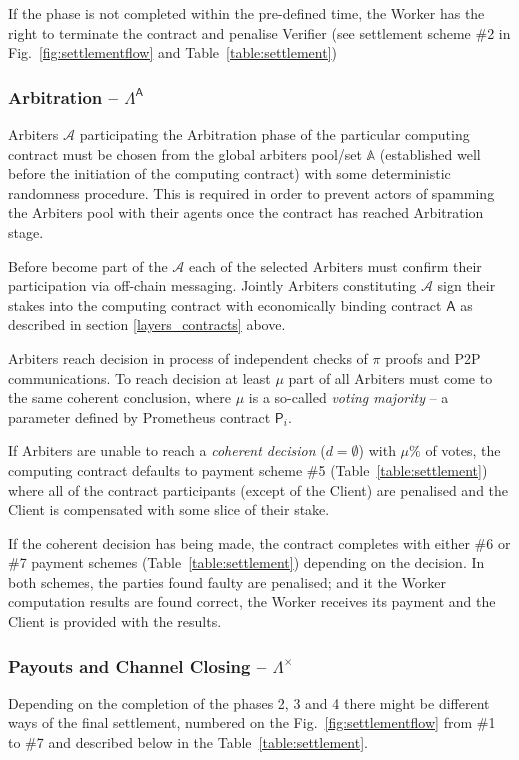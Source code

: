 \documentclass[a4paper]{article}
\begin{document}
If the phase is not completed within the pre-defined time, the Worker has the right to terminate the contract and penalise Verifier (see settlement scheme \#2 in Fig.~\ref{fig:settlementflow} and Table~\ref{table:settlement})

\subsubsection{Arbitration -- $\Lambda^\mathsf{A}$}
Arbiters $\mathcal{A}$ participating the Arbitration phase of the particular computing contract must be chosen from the global arbiters pool/set $\mathbb{A}$ (established well before the initiation of the computing contract) with some deterministic randomness procedure. This is required in order to prevent actors of spamming the Arbiters pool with their agents once the contract has reached Arbitration stage. 

Before become part of the $\mathcal{A}$ each of the selected Arbiters must confirm their participation via off-chain messaging. Jointly Arbiters constituting $\mathcal{A}$ sign their stakes into the computing contract with economically binding contract $\mathsf{A}$ as described in section \ref{layers_contracts} above.

Arbiters reach decision in process of independent checks of $\pi$ proofs and P2P communications. To reach decision at least $\mu$ part of all Arbiters must come to the same coherent conclusion, where $\mu$ is a so-called \textit{voting majority} -- a parameter defined by Prometheus contract $\mathsf{P}_i$.

If Arbiters are unable to reach a \textit{coherent decision} ($d=\emptyset$) with $\mu\%$ of votes, the computing contract defaults to payment scheme \#5 (Table~\ref{table:settlement}) where all of the contract participants (except of the Client) are penalised and the Client is compensated with some slice of their stake.

If the coherent decision has being made, the contract completes with either \#6 or \#7 payment schemes (Table~\ref{table:settlement}) depending on the decision. In both schemes, the parties found faulty are penalised; and it the Worker computation results are found correct, the Worker receives its payment and the Client is provided with the results.

\subsubsection{Payouts and Channel Closing -- $\Lambda^\mathsf{\times}$}
Depending on the completion of the phases 2, 3 and 4 there might be different ways of the final settlement, numbered on the Fig.~\ref{fig:settlementflow} from \#1 to \#7 and described below in the Table~\ref{table:settlement}.
\end{document}
